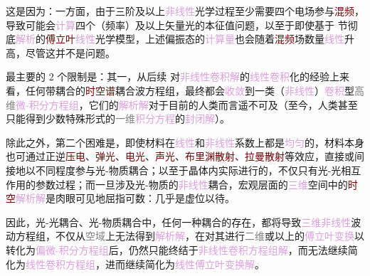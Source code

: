 这是因为：一方面，由于三阶及以上\textcolor{Plum}{非线性}光学过程至少需要四个电场参与\textcolor{Maroon}{混频}，导致可能会\textcolor{Plum}{计算}四个（频率）及以上矢量光的\textcolor{PineGreen}{本征值}问题，以至于即使基于  节彻底\textcolor{Plum}{解析}的\textcolor{Maroon}{傅立叶}\textcolor{Plum}{线性}光学模型，上述\textcolor{PineGreen}{偏振态}的\textcolor{Plum}{计算量}也会随着\textcolor{Maroon}{混频}场数量\textcolor{Plum}{线性}升高，尽管这并不是问题。

最主要的 2 个限制是：其一，从后续  对\textcolor{Plum}{非线性卷积}\textcolor{Plum}{解}的\textcolor{Plum}{线性卷积}化的经验上来看，任何带\textcolor{NavyBlue}{耦合}的\textcolor{Maroon}{时空谱}耦合波方程组，最终都会\textcolor{Plum}{收敛}到一类（\textcolor{Plum}{非线性}）\textcolor{Plum}{卷积}型\textcolor{gray}{高维}\textcolor{Plum}{微-积分方程组}，它们的\textcolor{Plum}{解析}\textcolor{Plum}{解}对于目前的人类而言遥不可及（至今，人类甚至只能得到少数特殊形式的\textcolor{gray}{一维}\textcolor{Plum}{积分方程}的\textcolor{Plum}{封闭}\textcolor{Plum}{解}\cite{ponomarevAsymptoticSolutionConvolution2021}）。

除此之外，第二个困难是，即使材料在\textcolor{Plum}{线性}和\textcolor{Plum}{非线性}系数上都是\textcolor{Plum}{均匀}的，材料本身也可通过正逆\textcolor{Maroon}{压电}、\textcolor{Maroon}{弹光}、\textcolor{Maroon}{电光}、\textcolor{Maroon}{声光}、\textcolor{Maroon}{布里渊散射}、\textcolor{Maroon}{拉曼散射}等效应，直接或间接地以不同程度参与\textcolor{NavyBlue}{光-物质}\textcolor{NavyBlue}{耦合}；以至于晶体内实际进行的，不仅只有\textcolor{NavyBlue}{光-光相互作用}的\textcolor{NavyBlue}{参数过程}；而一旦涉及\textcolor{NavyBlue}{光-物质}的\textcolor{Plum}{非线性}\textcolor{NavyBlue}{耦合}，宏观层面的\textcolor{Plum}{三维}空间中的\textcolor{Maroon}{时空}\textcolor{Plum}{解析}\textcolor{Plum}{解}是肉眼可见地屈指可数：几乎是虚位以待。

因此，\textcolor{NavyBlue}{光-光}\textcolor{NavyBlue}{耦合}、\textcolor{NavyBlue}{光-物质}\textcolor{NavyBlue}{耦合}中，任何一种\textcolor{NavyBlue}{耦合}的存在，都将导致\textcolor{Plum}{三维}\textcolor{Plum}{非线性}波动方程组，不仅从\textcolor{gray}{空域}上无法得到\textcolor{Plum}{解析}\textcolor{Plum}{解}，在对其进行\textcolor{gray}{二维}或以上的\textcolor{Plum}{傅立叶变换}以转化为\textcolor{Plum}{偏微-积分方程组}后，仍然只能终结于\textcolor{Plum}{非线性卷积方程组}\textcolor{Plum}{解}，而无法继续简化为\textcolor{Plum}{线性卷积方程组}，进而继续简化为\textcolor{Plum}{线性}\textcolor{Plum}{傅立叶变换}\textcolor{Plum}{解}。

